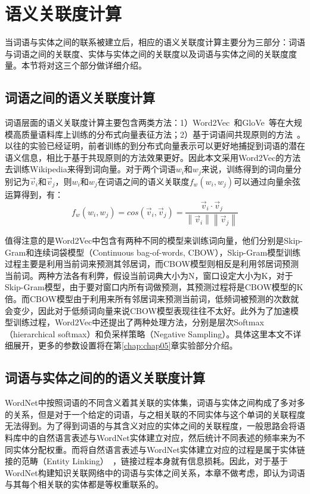 \section{语义关联度计算}
当词语与实体之间的联系被建立后，相应的语义关联度计算主要分为三部分：词语与词语之间的关联度、实体与实体之间的关联度以及词语与实体之间的关联度度量。本节将对这三个部分做详细介绍。

\subsection{词语之间的语义关联度计算}
\label{word2vec}
词语层面的语义关联度计算主要包含两类方法：1）Word2Vec~\cite{corr/Mikolov13}和GloVe~\cite{emnlp/PenningtonSM14}等在大规模高质量语料库上训练的分布式向量表征方法；2）基于词语间共现原则的方法~\cite{aaai/StrubeP06, ijcai/GabrilovichM07}。以往的实验已经证明，前者训练的到分布式向量表示可以更好地捕捉到词语的潜在语义信息，相比于基于共现原则的方法效果更好。因此本文采用Word2Vec的方法去训练Wikipedia来得到词向量。对于两个词语$w_i$和$w_j$来说，训练得到的词向量分别记为$\vec v_i$和$\vec v_j$，则$w_i$和$w_j$在词语之间的语义关联度$f_w(w_i, w_j)$可以通过向量余弦运算得到，有：
\begin{equation}
    \label{cos}
    f_w(w_i, w_j) = cos(\vec v_i,\vec v_j) = \frac{\vec v_i \cdot 
    \vec v_j}{\left \| \vec v_i \right \|\left \| \vec v_j \right \|}
\end{equation}

值得注意的是Word2Vec中包含有两种不同的模型来训练词向量，他们分别是Skip-Gram和连续词袋模型（Continuous bag-of-words, CBOW），Skip-Gram模型训练过程主要是利用当前词来预测其邻居词，而CBOW模型则相反是利用邻居词预测当前词。两种方法各有利弊，假设当前词典大小为N，窗口设定大小为K，对于Skip-Gram模型，由于要对窗口内所有词做预测，其预测过程将是CBOW模型的K倍。而CBOW模型由于利用来所有邻居词来预测当前词，低频词被预测的次数就会变少，因此对于低频词向量来说CBOW模型表现往往不太好。此外为了加速模型训练过程，Word2Vec中还提出了两种处理方法，分别是层次Softmax（hierarchical softmax）和负采样策略（Negative Sampling）。具体这里本文不详细展开，更多的参数设置将在第\ref{chap:chap05}章实验部分介绍。

\subsection{词语与实体之间的的语义关联度计算}
WordNet中按照词语的不同含义着其关联的实体集，词语与实体之间构成了多对多的关系，但是对于一个给定的词语，与之相关联的不同实体与这个单词的关联程度无法得到。为了得到词语的与其含义对应的实体之间的关联程度，一般思路会将语料库中的自然语言表述与WordNet实体建立对应，然后统计不同表述的频率来为不同实体分配权重。而将自然语言表述与WordNet实体建立对应的过程是属于实体链接的范畴（Entity Linking）~\cite{陆伟实体链接研究综述}，链接过程本身就有信息损耗。因此，对于基于WordNet构建知识关联网络中的词语与实体之间关系，本章不做考虑，即认为词语与其每个相关联的实体都是等权重联系的。

